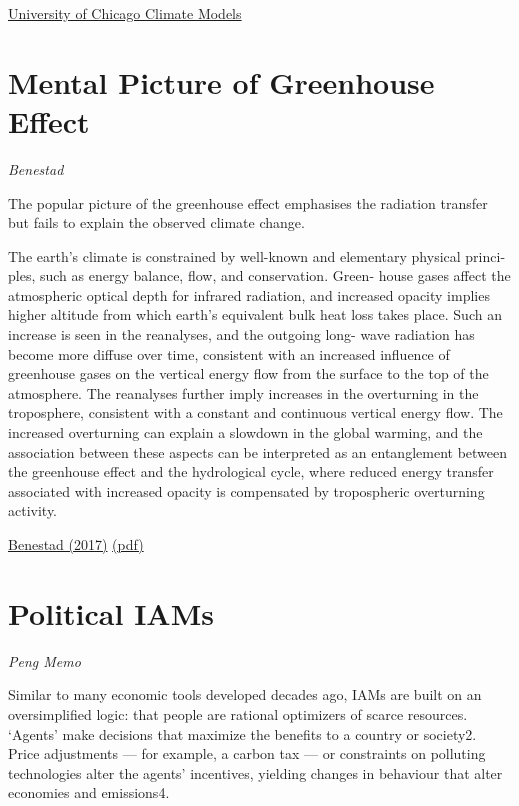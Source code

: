 \documentclass[
]{book}
\begin{document}
\href{http://climatemodels.uchicago.edu/}{University of Chicago Climate Models}

\hypertarget{mental-picture-of-greenhouse-effect}{%
\section{Mental Picture of Greenhouse Effect}\label{mental-picture-of-greenhouse-effect}}

\emph{Benestad}

The popular picture of the greenhouse effect
emphasises the radiation transfer but fails to explain the
observed climate change.

The earth's climate is
constrained by well-known and elementary physical princi-
ples, such as energy balance, flow, and conservation. Green-
house gases affect the atmospheric optical depth for infrared
radiation, and increased opacity implies higher altitude from
which earth's equivalent bulk heat loss takes place. Such an
increase is seen in the reanalyses, and the outgoing long-
wave radiation has become more diffuse over time, consistent
with an increased influence of greenhouse gases on the
vertical energy flow from the surface to the top of the atmosphere.
The reanalyses further imply increases in the overturning
in the troposphere, consistent with a constant and
continuous vertical energy flow. The increased overturning
can explain a slowdown in the global warming, and the
association between these aspects can be interpreted as an
entanglement between the greenhouse effect and the hydrological cycle,
where reduced energy transfer associated with increased opacity
is compensated by tropospheric overturning activity.

\href{https://link.springer.com/article/10.1007/s00704-016-1732-y}{Benestad (2017)}
\href{pdf/Benestad_2017_Mental_Picture_of_Greenhouse_Effect.pdf}{(pdf)}

\hypertarget{political-iams}{%
\section{Political IAMs}\label{political-iams}}

\emph{Peng Memo}

Similar to many economic tools developed decades ago, IAMs are built on an oversimplified logic: that people are rational optimizers of scarce resources. `Agents' make decisions that maximize the benefits to a country or society2. Price adjustments --- for example, a carbon tax --- or constraints on polluting technologies alter the agents' incentives, yielding changes in behaviour that alter economies and emissions4.
\end{document}
